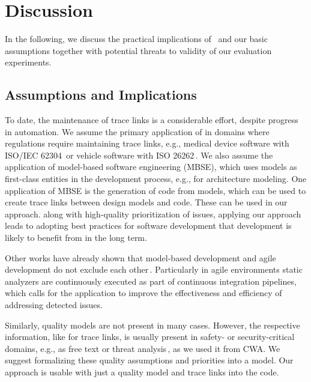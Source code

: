 \section{Discussion}\label{sec:disc}

In the following, we discuss the practical implications of \appr\ and our basic assumptions together with potential threats to validity of our evaluation experiments.

\subsection{Assumptions and Implications}
\label{sec:implication}
To date, the maintenance of trace links is a considerable effort, despite progress in automation.
We assume the primary application of \appr{} in domains where regulations require maintaining  trace links, e.g., medical device software with ISO/IEC 62304\,\cite{IEC62304} or vehicle software with ISO 26262\,\cite{ISO26262}.
We also assume the application of model-based software engineering (MBSE), which uses models as first-class entities in the development process, e.g., for architecture modeling.
One application of MBSE is the generation of code from models, which can be used to create trace links between design models and code.
These can be used in our approach.
 along with high-quality prioritization of issues, applying our approach leads to adopting best practices for software development that development is likely to benefit from in the long term.

Other works have already shown that model-based development and agile development do not exclude each other\,\cite{Gray2018}.
Particularly in agile environments static analyzers are continuously executed as part of continuous integration pipelines, which calls for the application \appr{} to improve the effectiveness and efficiency of addressing detected issues.

Similarly, quality models are not present in many cases.
However, the respective information, like for trace links, is usually present in safety- or security-critical domains, e.g., as free text or threat analysis\,\cite{TUMA2018275}, as we used it from CWA.
We suggest formalizing  these quality assumptions and priorities into a model.
Our approach is usable with just a quality model and trace links into the code.



